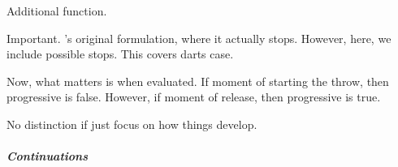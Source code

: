 \begin{note}
  Additional function.

  \begin{algorithm}[H]
    \SetAlgoLined
    \DontPrintSemicolon
    \caption{\AlgPC{}\label{PrAl:g-p-c}}
  \end{algorithm}

  Important.
  \citeauthor{Landman:1992wh}'s original formulation, where it actually stops.
  However, here, we include possible stops.
  This covers darts case.

  Now, what matters is when evaluated.
  If moment of starting the throw, then progressive is false.
  However, if moment of release, then progressive is true.

  No distinction if just focus on how things develop.
\end{note}

\subparagraph{Continuations}

\begin{note}
  \begin{algorithm}[H]
    \SetAlgoLined
    \DontPrintSemicolon
    \caption{\AlgGetCs{}\label{PrAl:g-c}}
  \end{algorithm}
\end{note}


